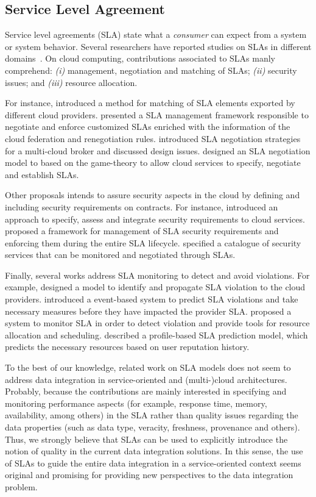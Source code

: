 \subsection{Service Level Agreement}
Service level agreements (SLA) state what a \textsl{consumer} can expect from a system or 
system behavior.
Several researchers have reported studies on SLAs in different domains~\cite{AlhamadDC11}.
On cloud computing, contributions associated to SLAs manly comprehend: \textit{(i)} management, 
negotiation and matching of SLAs; \textit{(ii)} security issues; and \textit{(iii)} resource allocation. 

For instance, \cite{Redl2012} introduced a method for matching of SLA elements exported by different cloud providers.
%
\cite{Mavrogeorgi2013} presented a SLA management framework responsible to negotiate and enforce
customized SLAs enriched with the information of the cloud federation and renegotiation rules.
%
\cite{Son2014} introduced SLA negotiation strategies for a multi-cloud broker and discussed
design issues.
%
\cite{Falasi2016} designed an SLA negotiation model to based on the game-theory to allow cloud
services to specify, negotiate and establish SLAs.
%  

Other proposals intends to assure security aspects in the cloud by defining and including
security requirements on contracts. For instance, \cite{rak2013} introduced an approach to specify,
assess and integrate security requirements to cloud services. 
%
\cite{Rojas2016} proposed a framework for management of SLA security requirements and enforcing them
during the entire SLA lifecycle.
%
\cite{Casola2016} specified a catalogue of security services that can be monitored and negotiated through SLAs.

Finally, several works address SLA monitoring to detect and avoid violations.
For example, \cite{Brandic2010} designed a model to identify and propagate
SLA violation to the cloud providers. 
\cite{Leitner2010} introduced a event-based system to predict SLA violations
and take necessary measures before they have impacted the provider SLA.
\cite{Emeakaroha2012} proposed a system to monitor SLA in order to detect violation
and provide tools for resource allocation and scheduling. 
\cite{Hussain2015} described a profile-based SLA prediction model, which predicts
the necessary resources based on user reputation history.
 
To the best of our knowledge, related work on SLA models does not seem to 
address data integration in service-oriented and (multi-)cloud architectures. Probably, because the 
contributions are mainly interested in specifying and monitoring performance 
aspects (for example, response time, memory, availability, among others) in the SLA 
rather than quality issues regarding the data properties (such as data type, 
veracity, freshness, provenance and others).
Thus, we strongly believe that SLAs can be used to explicitly introduce the 
notion of quality in the current data integration solutions. 
In this sense, the use of SLAs to guide the entire data integration in a 
service-oriented context seems original and promising for providing new perspectives to the data integration problem.

